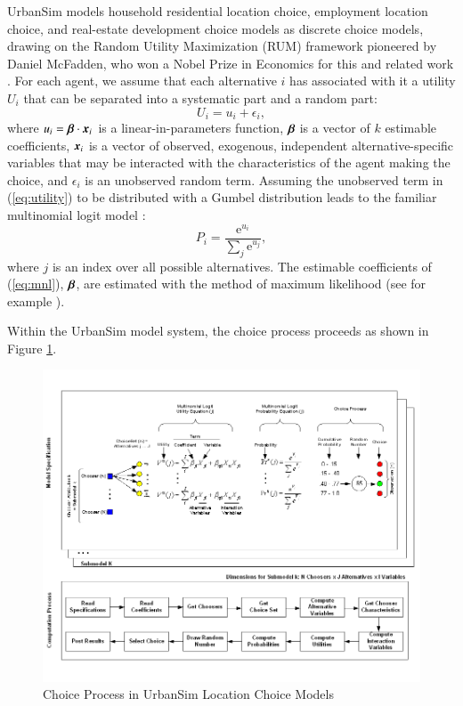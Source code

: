 \documentclass[12pt,a4paper]{article}
\newcommand{\vk}[1]{\mbox{\boldmath $#1$}}
\begin{document}
UrbanSim models household residential location choice, employment
location choice, and real-estate development choice models as
discrete choice models, drawing on the Random Utility Maximization
(RUM) framework pioneered by Daniel McFadden, who won a Nobel
Prize in Economics for this and related work
\cite{mcfadden-1974,mcfadden-1981}. For each agent, we assume that
each alternative $i$ has associated with it a utility $U_i$ that
can be separated into a systematic part and a random part:
\begin{equation}
    U_i = u_i + \epsilon_i,
    \label{eq:utility}
\end{equation}
where $u_i = \vk{\beta}\cdot\vk{x}_i$ is a linear-in-parameters
function, $\vk{\beta}$ is a vector of $k$ estimable coefficients,
$\vk{x}_i$ is a vector of observed, exogenous, independent
alternative-specific variables that may be interacted with the
characteristics of the agent making the choice, and $\epsilon_i$
is an unobserved random term. Assuming the unobserved term in
(\ref{eq:utility}) to be distributed with a Gumbel distribution
leads to the familiar multinomial logit model
\cite{mcfadden-1974,mcfadden-1981}:
\begin{equation}
    P_i = \frac{\mathrm{e}^{u_i}}{\sum_j \mathrm{e}^{u_j}},
    \label{eq:mnl}
\end{equation}
where $j$ is an index over all possible alternatives. The
estimable coefficients of (\ref{eq:mnl}), $\vk{\beta}$, are
estimated with the method of maximum likelihood (see for example
\cite{Greene-2002}).

Within the UrbanSim model system, the choice process proceeds as
shown in Figure \ref{fig:choiceprocess}.

\begin{figure}[h]
\center
 \includegraphics[width=6.5in]
 {ChoiceProcess.png}
\caption{Choice Process in UrbanSim Location Choice Models}
\label{fig:choiceprocess}
\end{figure}
\end{document}
